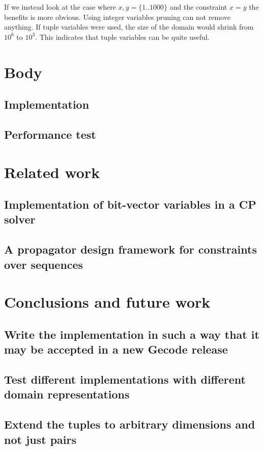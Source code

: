 \documentclass[a4paper,11pt]{article}
\begin{document}
If we instead look at the case where $x,y=\{1..1000\}$ and the constraint $x=y$ the benefits is more obvious. Using integer variables pruning can not remove anything. If tuple variables were used, the size of the domain would shrink from $10^6$ to $10^3$. This indicates that tuple variables can be quite useful.

\section{Body}

\subsection{Implementation}

\subsection{Performance test}

\section{Related work}
\subsection{Implementation of bit-vector variables in a CP solver}
\subsection{A propagator design framework for constraints over sequences}

\section{Conclusions and future work}

\subsection{Write the implementation in such a way that it may be accepted in a new Gecode release}
\subsection{Test different implementations with different domain representations}
\subsection{Extend the tuples to arbitrary dimensions and not just pairs}
\end{document}
